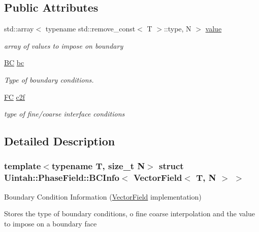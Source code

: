 \subsection*{Public Attributes}
\begin{DoxyCompactItemize}
\item 
std\+::array$<$ typename std\+::remove\+\_\+const$<$ T $>$\+::type, N $>$ \hyperlink{structUintah_1_1PhaseField_1_1BCInfo_3_01VectorField_3_01T_00_01N_01_4_01_4_a7c5590e798cd64c8fadaa2dbbfdbc6c0}{value}
\begin{DoxyCompactList}\small\item\em array of values to impose on boundary \end{DoxyCompactList}\item 
\hyperlink{namespaceUintah_1_1PhaseField_a148fba372aa3be96fd6eede7a2fa10b5}{BC} \hyperlink{structUintah_1_1PhaseField_1_1BCInfo_3_01VectorField_3_01T_00_01N_01_4_01_4_adc26b61112f16d2e2117d86dea179b34}{bc}
\begin{DoxyCompactList}\small\item\em Type of boundary conditions. \end{DoxyCompactList}\item 
\hyperlink{namespaceUintah_1_1PhaseField_aeb51fe956fe07f1487f5878f4039f27c}{FC} \hyperlink{structUintah_1_1PhaseField_1_1BCInfo_3_01VectorField_3_01T_00_01N_01_4_01_4_a9843129baa022ca05ed9cd91834398c0}{c2f}
\begin{DoxyCompactList}\small\item\em type of fine/coarse interface conditions \end{DoxyCompactList}\end{DoxyCompactItemize}


\subsection{Detailed Description}
\subsubsection*{template$<$typename T, size\+\_\+t N$>$\newline
struct Uintah\+::\+Phase\+Field\+::\+B\+C\+Info$<$ Vector\+Field$<$ T, N $>$ $>$}

Boundary Condition Information (\hyperlink{structUintah_1_1PhaseField_1_1VectorField}{Vector\+Field} implementation) 

Stores the type of boundary conditions, o fine coarse interpolation and the value to impose on a boundary face


